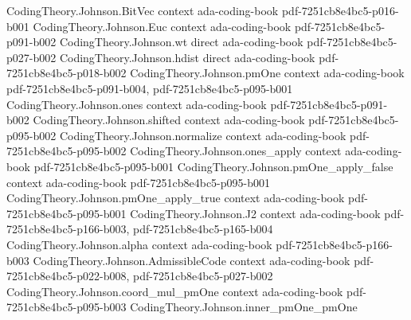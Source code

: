 \begin{theorem}
\label{CodingTheory.Johnson.rankin_bound_general}
\leanok
{}
\proofstep
  {CodingTheory.Johnson.BitVec}
  {context}
  {ada-coding-book}
  {pdf-7251cb8e4bc5-p016-b001}
\proofstep
  {CodingTheory.Johnson.Euc}
  {context}
  {ada-coding-book}
  {pdf-7251cb8e4bc5-p091-b002}
\proofstep
  {CodingTheory.Johnson.wt}
  {direct}
  {ada-coding-book}
  {pdf-7251cb8e4bc5-p027-b002}
\proofstep
  {CodingTheory.Johnson.hdist}
  {direct}
  {ada-coding-book}
  {pdf-7251cb8e4bc5-p018-b002}
\proofstep
  {CodingTheory.Johnson.pmOne}
  {context}
  {ada-coding-book}
  {pdf-7251cb8e4bc5-p091-b004,
    pdf-7251cb8e4bc5-p095-b001}
\proofstep
  {CodingTheory.Johnson.ones}
  {context}
  {ada-coding-book}
  {pdf-7251cb8e4bc5-p091-b002}
\proofstep
  {CodingTheory.Johnson.shifted}
  {context}
  {ada-coding-book}
  {pdf-7251cb8e4bc5-p095-b002}
\proofstep
  {CodingTheory.Johnson.normalize}
  {context}
  {ada-coding-book}
  {pdf-7251cb8e4bc5-p095-b002}
\proofstep
  {CodingTheory.Johnson.ones_apply}
  {context}
  {ada-coding-book}
  {pdf-7251cb8e4bc5-p095-b001}
\proofstep
  {CodingTheory.Johnson.pmOne_apply_false}
  {context}
  {ada-coding-book}
  {pdf-7251cb8e4bc5-p095-b001}
\proofstep
  {CodingTheory.Johnson.pmOne_apply_true}
  {context}
  {ada-coding-book}
  {pdf-7251cb8e4bc5-p095-b001}
\proofstep
  {CodingTheory.Johnson.J2}
  {context}
  {ada-coding-book}
  {pdf-7251cb8e4bc5-p166-b003,
    pdf-7251cb8e4bc5-p165-b004}
\proofstep
  {CodingTheory.Johnson.alpha}
  {context}
  {ada-coding-book}
  {pdf-7251cb8e4bc5-p166-b003}
\proofstep
  {CodingTheory.Johnson.AdmissibleCode}
  {context}
  {ada-coding-book}
  {pdf-7251cb8e4bc5-p022-b008,
    pdf-7251cb8e4bc5-p027-b002}
\proofstep
  {CodingTheory.Johnson.coord_mul_pmOne}
  {context}
  {ada-coding-book}
  {pdf-7251cb8e4bc5-p095-b003}
\proofstep
  {CodingTheory.Johnson.inner_pmOne_pmOne}

\end{theorem}
